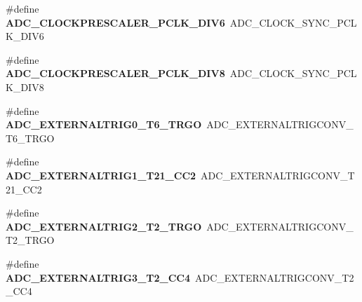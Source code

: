 \begin{DoxyCompactItemize}
\item 
\#define {\bfseries A\+D\+C\+\_\+\+C\+L\+O\+C\+K\+P\+R\+E\+S\+C\+A\+L\+E\+R\+\_\+\+P\+C\+L\+K\+\_\+\+D\+I\+V6}~A\+D\+C\+\_\+\+C\+L\+O\+C\+K\+\_\+\+S\+Y\+N\+C\+\_\+\+P\+C\+L\+K\+\_\+\+D\+I\+V6\hypertarget{group___h_a_l___a_d_c___aliased___defines_gae5cbf680825b9ccaa02bdbab9217f550}{}\label{group___h_a_l___a_d_c___aliased___defines_gae5cbf680825b9ccaa02bdbab9217f550}

\item 
\#define {\bfseries A\+D\+C\+\_\+\+C\+L\+O\+C\+K\+P\+R\+E\+S\+C\+A\+L\+E\+R\+\_\+\+P\+C\+L\+K\+\_\+\+D\+I\+V8}~A\+D\+C\+\_\+\+C\+L\+O\+C\+K\+\_\+\+S\+Y\+N\+C\+\_\+\+P\+C\+L\+K\+\_\+\+D\+I\+V8\hypertarget{group___h_a_l___a_d_c___aliased___defines_ga93ccda8f421de00a2aa5b0b19b665393}{}\label{group___h_a_l___a_d_c___aliased___defines_ga93ccda8f421de00a2aa5b0b19b665393}

\item 
\#define {\bfseries A\+D\+C\+\_\+\+E\+X\+T\+E\+R\+N\+A\+L\+T\+R\+I\+G0\+\_\+\+T6\+\_\+\+T\+R\+GO}~A\+D\+C\+\_\+\+E\+X\+T\+E\+R\+N\+A\+L\+T\+R\+I\+G\+C\+O\+N\+V\+\_\+\+T6\+\_\+\+T\+R\+GO\hypertarget{group___h_a_l___a_d_c___aliased___defines_ga72d7fcd1d65274786de2b3ccd6b853c4}{}\label{group___h_a_l___a_d_c___aliased___defines_ga72d7fcd1d65274786de2b3ccd6b853c4}

\item 
\#define {\bfseries A\+D\+C\+\_\+\+E\+X\+T\+E\+R\+N\+A\+L\+T\+R\+I\+G1\+\_\+\+T21\+\_\+\+C\+C2}~A\+D\+C\+\_\+\+E\+X\+T\+E\+R\+N\+A\+L\+T\+R\+I\+G\+C\+O\+N\+V\+\_\+\+T21\+\_\+\+C\+C2\hypertarget{group___h_a_l___a_d_c___aliased___defines_gab001be8f7abe45ddf92a476a65c6dd50}{}\label{group___h_a_l___a_d_c___aliased___defines_gab001be8f7abe45ddf92a476a65c6dd50}

\item 
\#define {\bfseries A\+D\+C\+\_\+\+E\+X\+T\+E\+R\+N\+A\+L\+T\+R\+I\+G2\+\_\+\+T2\+\_\+\+T\+R\+GO}~A\+D\+C\+\_\+\+E\+X\+T\+E\+R\+N\+A\+L\+T\+R\+I\+G\+C\+O\+N\+V\+\_\+\+T2\+\_\+\+T\+R\+GO\hypertarget{group___h_a_l___a_d_c___aliased___defines_gaad24eb6d74f2e4396d59afc4c715a053}{}\label{group___h_a_l___a_d_c___aliased___defines_gaad24eb6d74f2e4396d59afc4c715a053}

\item 
\#define {\bfseries A\+D\+C\+\_\+\+E\+X\+T\+E\+R\+N\+A\+L\+T\+R\+I\+G3\+\_\+\+T2\+\_\+\+C\+C4}~A\+D\+C\+\_\+\+E\+X\+T\+E\+R\+N\+A\+L\+T\+R\+I\+G\+C\+O\+N\+V\+\_\+\+T2\+\_\+\+C\+C4\hypertarget{group___h_a_l___a_d_c___aliased___defines_gaa0f8054b3363d13a190ee0d366363575}{}\label{group___h_a_l___a_d_c___aliased___defines_gaa0f8054b3363d13a190ee0d366363575}


\end{DoxyCompactItemize}
